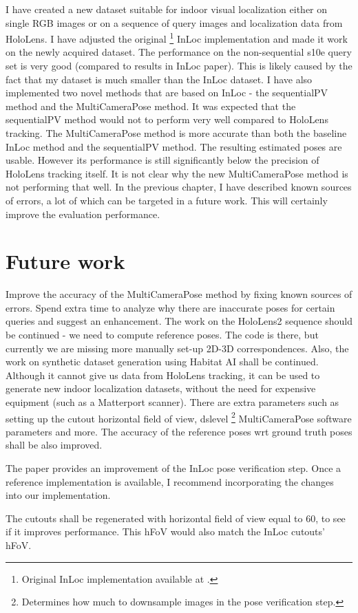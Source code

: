 \documentclass[twoside]{ctuthesis}
\theoremstyle{plain}
\theoremstyle{definition}
\theoremstyle{note}
\begin{document}
I have created a new dataset suitable for indoor visual localization either on single RGB images or on a sequence of query images and localization data from HoloLens. I have adjusted the original \footnote{Original InLoc implementation available at \cite{InLocImplementation}.} InLoc implementation and made it work on the newly acquired dataset. The performance on the non-sequential s10e query set is very good (compared to results in InLoc paper). This is likely caused by the fact that my dataset is much smaller than the InLoc dataset. I have also implemented two novel methods that are based on InLoc \cite{taira2018inloc} - the sequentialPV method and the MultiCameraPose method. It was expected that the sequentialPV method would not to perform very well compared to HoloLens tracking. The MultiCameraPose method is more accurate than both the baseline InLoc method and the sequentialPV method. The resulting estimated poses are usable. However its performance is still significantly below the precision of HoloLens tracking itself. It is not clear why the new MultiCameraPose method is not performing that well. In the previous chapter, I have described known sources of errors, a lot of which can be targeted in a future work. This will certainly improve the evaluation performance.

\section{Future work}
Improve the accuracy of the MultiCameraPose method by fixing known sources of errors. Spend extra time to analyze why there are inaccurate poses for certain queries and suggest an enhancement. The work on the HoloLens2 sequence should be continued - we need to compute reference poses. The code is there, but currently we are missing more manually set-up 2D-3D correspondences. Also, the work on synthetic dataset generation using Habitat AI shall be continued. Although it cannot give us data from HoloLens tracking, it can be used to generate new indoor localization datasets, without the need for expensive equipment (such as a Matterport scanner). There are extra parameters such as setting up the cutout horizontal field of view, dslevel \footnote{Determines how much to downsample images in the pose verification step.} MultiCameraPose software \cite{MultiCameraPose} parameters and more. The accuracy of the reference poses wrt ground truth poses shall be also improved.

The paper \cite{IsThisTheRightPlace} provides an improvement of the InLoc pose verification step. Once a reference implementation is available, I recommend incorporating the changes into our implementation.

The cutouts shall be regenerated with horizontal field of view equal to 60\degree, to see if it improves performance. This hFoV would also match the InLoc cutouts' hFoV.

\appendix

\printindex

\appendix

%



\end{document}
